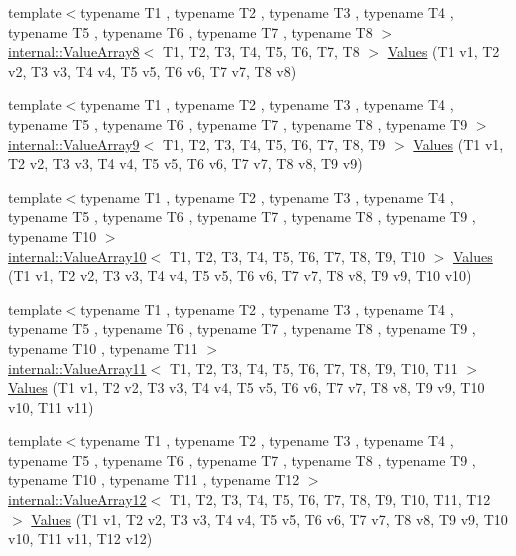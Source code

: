 \begin{DoxyCompactItemize}
\item 
{\footnotesize template$<$typename T1 , typename T2 , typename T3 , typename T4 , typename T5 , typename T6 , typename T7 , typename T8 $>$ }\\\mbox{\hyperlink{classtesting_1_1internal_1_1_value_array8}{internal\+::\+Value\+Array8}}$<$ T1, T2, T3, T4, T5, T6, T7, T8 $>$ \mbox{\hyperlink{namespacetesting_a1eda12e6518e4c51c1bb2e7cc9d31ffa}{Values}} (T1 v1, T2 v2, T3 v3, T4 v4, T5 v5, T6 v6, T7 v7, T8 v8)
\item 
{\footnotesize template$<$typename T1 , typename T2 , typename T3 , typename T4 , typename T5 , typename T6 , typename T7 , typename T8 , typename T9 $>$ }\\\mbox{\hyperlink{classtesting_1_1internal_1_1_value_array9}{internal\+::\+Value\+Array9}}$<$ T1, T2, T3, T4, T5, T6, T7, T8, T9 $>$ \mbox{\hyperlink{namespacetesting_ab663e13807ad5cc223814797c9191a58}{Values}} (T1 v1, T2 v2, T3 v3, T4 v4, T5 v5, T6 v6, T7 v7, T8 v8, T9 v9)
\item 
{\footnotesize template$<$typename T1 , typename T2 , typename T3 , typename T4 , typename T5 , typename T6 , typename T7 , typename T8 , typename T9 , typename T10 $>$ }\\\mbox{\hyperlink{classtesting_1_1internal_1_1_value_array10}{internal\+::\+Value\+Array10}}$<$ T1, T2, T3, T4, T5, T6, T7, T8, T9, T10 $>$ \mbox{\hyperlink{namespacetesting_a2948b0215fce80155fdbad4e3608f4cd}{Values}} (T1 v1, T2 v2, T3 v3, T4 v4, T5 v5, T6 v6, T7 v7, T8 v8, T9 v9, T10 v10)
\item 
{\footnotesize template$<$typename T1 , typename T2 , typename T3 , typename T4 , typename T5 , typename T6 , typename T7 , typename T8 , typename T9 , typename T10 , typename T11 $>$ }\\\mbox{\hyperlink{classtesting_1_1internal_1_1_value_array11}{internal\+::\+Value\+Array11}}$<$ T1, T2, T3, T4, T5, T6, T7, T8, T9, T10, T11 $>$ \mbox{\hyperlink{namespacetesting_a4aaae77b8404038ed5f3bf56cccdb940}{Values}} (T1 v1, T2 v2, T3 v3, T4 v4, T5 v5, T6 v6, T7 v7, T8 v8, T9 v9, T10 v10, T11 v11)
\item 
{\footnotesize template$<$typename T1 , typename T2 , typename T3 , typename T4 , typename T5 , typename T6 , typename T7 , typename T8 , typename T9 , typename T10 , typename T11 , typename T12 $>$ }\\\mbox{\hyperlink{classtesting_1_1internal_1_1_value_array12}{internal\+::\+Value\+Array12}}$<$ T1, T2, T3, T4, T5, T6, T7, T8, T9, T10, T11, T12 $>$ \mbox{\hyperlink{namespacetesting_a03e7f9611794732bb030c53365dc6c86}{Values}} (T1 v1, T2 v2, T3 v3, T4 v4, T5 v5, T6 v6, T7 v7, T8 v8, T9 v9, T10 v10, T11 v11, T12 v12)

\end{DoxyCompactItemize}
